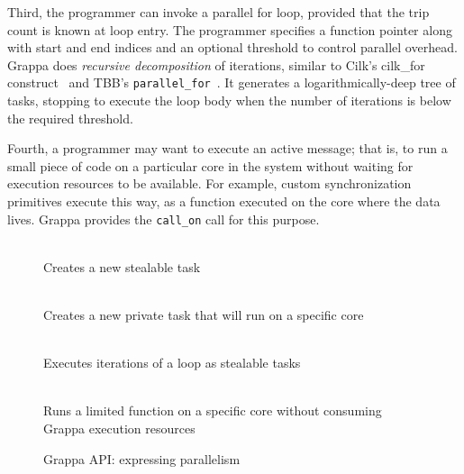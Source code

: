 Third, the programmer can invoke a parallel for loop, provided that
the trip count is known at loop entry. The programmer
specifies a function pointer along with start and end indices and an
optional threshold to control parallel overhead. Grappa does {\em
recursive decomposition} of iterations, similar to Cilk's cilk\_for
construct~\cite {cilkforimplementation}  and TBB's {\tt parallel\_for}~\cite{intel_tbb}.  It generates a
logarithmically-deep tree of tasks, stopping to execute the loop body
when the number of iterations is below the required threshold.

Fourth, a programmer may want to execute an active message; that is,
to run a small piece of code on a particular core in the system
without waiting for execution resources to be available.  For example,
custom synchronization primitives execute this way, as a function
executed on the core where the data lives.  Grappa provides the
\texttt{call\_on} call for this purpose.

\begin{figure}[htbp]
  \begin{center}
    \begin{description}\small
    \item[ \texttt{spawn( void (*fp)(args) )} ] \hfill \\
      Creates a new stealable task
    \item[ \texttt{spawn\_on( core, (*fp)(args) )} ] \hfill \\
      Creates a new private task that will run on a specific core 
    \item[ \texttt{parallel\_for( (*fp)(args), start, end )} ] \hfill \\
      Executes iterations of a loop as stealable tasks 
    \item[ \texttt{call\_on( core, (*fp)(args) )} ] \hfill \\ 
      Runs a limited function on a specific core without consuming
      Grappa execution resources 
    \end{description}
    \begin{minipage}{0.95\columnwidth}
      \caption{\label{fig:expressing-parallelism} Grappa API: expressing parallelism} %
    \end{minipage}
  \end{center}
\end{figure}

